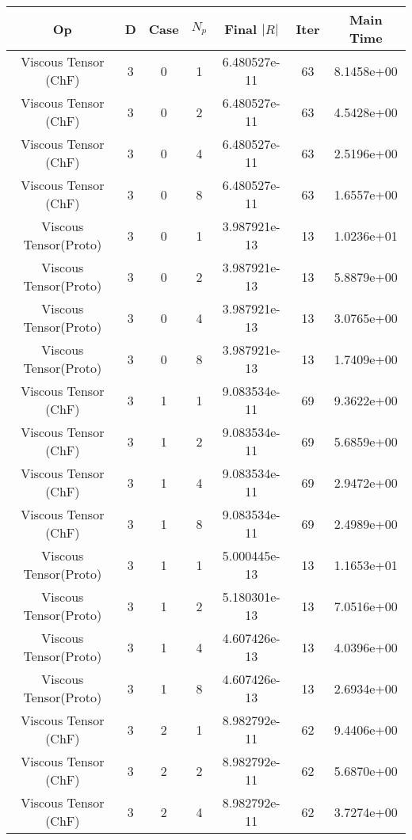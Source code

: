 \documentclass{article}
\begin{document}
\begin{small} 
  \begin{table} 
    \begin{center}
      \begin{tabular}{|c|c|c|c|c|c||c|} \hline 
Op & D & Case & $N_p$ & Final $|R|$  &  Iter & Main Time \\  
        \hline 
        Viscous Tensor  (ChF) & 3 & 0 & 1& 6.480527e-11 & 63 & 8.1458e+00\\
        Viscous Tensor  (ChF) & 3 & 0 & 2& 6.480527e-11 & 63 & 4.5428e+00\\
        Viscous Tensor  (ChF) & 3 & 0 & 4& 6.480527e-11 & 63 & 2.5196e+00\\
        Viscous Tensor  (ChF) & 3 & 0 & 8& 6.480527e-11 & 63 & 1.6557e+00\\
        Viscous Tensor(Proto) & 3 & 0 & 1& 3.987921e-13 & 13 & 1.0236e+01\\
        Viscous Tensor(Proto) & 3 & 0 & 2& 3.987921e-13 & 13 & 5.8879e+00\\
        Viscous Tensor(Proto) & 3 & 0 & 4& 3.987921e-13 & 13 & 3.0765e+00\\
        Viscous Tensor(Proto) & 3 & 0 & 8& 3.987921e-13 & 13 & 1.7409e+00\\
        \hline 
        Viscous Tensor  (ChF) & 3 & 1 & 1& 9.083534e-11 & 69 & 9.3622e+00\\
        Viscous Tensor  (ChF) & 3 & 1 & 2& 9.083534e-11 & 69 & 5.6859e+00\\
        Viscous Tensor  (ChF) & 3 & 1 & 4& 9.083534e-11 & 69 & 2.9472e+00\\
        Viscous Tensor  (ChF) & 3 & 1 & 8& 9.083534e-11 & 69 & 2.4989e+00\\
        Viscous Tensor(Proto) & 3 & 1 & 1& 5.000445e-13 & 13 & 1.1653e+01\\
        Viscous Tensor(Proto) & 3 & 1 & 2& 5.180301e-13 & 13 & 7.0516e+00\\
        Viscous Tensor(Proto) & 3 & 1 & 4& 4.607426e-13 & 13 & 4.0396e+00\\
        Viscous Tensor(Proto) & 3 & 1 & 8& 4.607426e-13 & 13 & 2.6934e+00\\
        \hline 
        Viscous Tensor  (ChF) & 3 & 2 & 1& 8.982792e-11 & 62 & 9.4406e+00\\
        Viscous Tensor  (ChF) & 3 & 2 & 2& 8.982792e-11 & 62 & 5.6870e+00\\
        Viscous Tensor  (ChF) & 3 & 2 & 4& 8.982792e-11 & 62 & 3.7274e+00\\

\end{tabular}
\end{center}
\end{table}
\end{small}
\end{document}
